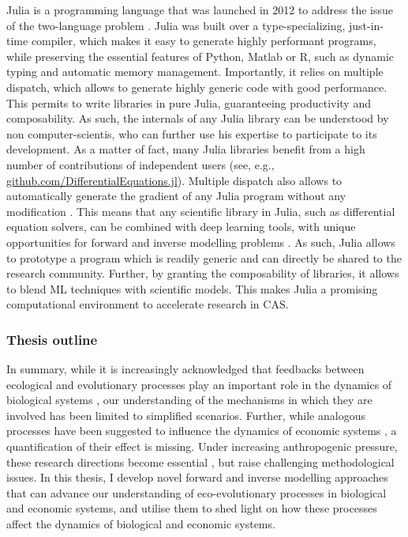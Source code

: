Julia is a programming language that was launched in 2012 to address the issue of the two-language problem \cite{Bezanson2017,Bezanson2018}. Julia was built over a type-specializing, just-in-time compiler, which makes it easy to generate highly performant programs, while preserving the essential features of Python, Matlab or R, such as dynamic typing and automatic memory management.
% 
Importantly, it relies on multiple dispatch, which allows to generate highly generic code with good performance. This permits to write libraries in pure Julia, guaranteeing productivity and composability.
% 
% 
As such, the internals of any Julia library can be understood by non computer-scientis, who can further use his expertise to participate to its development. As a matter of fact, many Julia libraries benefit from a high number of contributions of independent users (see, e.g., \href{github.com/DifferentialEquations.jl}{github.com/DifferentialEquations.jl}).
% 
Multiple dispatch also allows to automatically generate the gradient of any Julia program without any modification \cite{ForwardDiff.jl, Zygote.jl}. This means that any scientific library in Julia, such as differential equation solvers, can be combined with deep learning tools, with unique opportunities for forward and inverse modelling problems \cite{Frank2022}. 
% 
% 
As such, Julia allows to prototype a program which is readily generic and can directly be shared to the research community. Further, by granting the composability of libraries, it allows to blend ML techniques with scientific models. This makes Julia a promising computational environment to accelerate research in CAS. 

\subsubsection*{Thesis outline}

In summary, while it is increasingly acknowledged that feedbacks between ecological and evolutionary processes play an important role in the dynamics of biological systems \cite{Pelletier2009, Urban2016}, our understanding of the mechanisms in which they are involved has been limited to simplified scenarios.
% 
Further, while analogous processes have been suggested to influence the dynamics of economic systems \cite{Hodgson2019}, a quantification of their effect is missing.
%
Under increasing anthropogenic pressure, these research directions become essential \cite{Urban2016}, but raise challenging methodological issues.
% 
In this thesis, I develop novel forward and inverse modelling approaches that can advance our understanding of eco-evolutionary processes in biological and economic systems, and utilise them to shed light on how these processes affect the dynamics of biological and economic systems.


